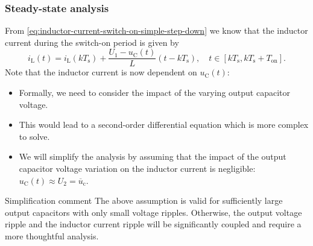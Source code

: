 \begin{frame}
    \frametitle{Steady-state analysis}
    From \eqref{eq:inductor-current-switch-on-simple-step-down} we know that the inductor current during the switch-on period is given by
    \begin{equation*}
        i_\mathrm{L}(t) = i_\mathrm{L}(k T_\mathrm{s}) + \frac{U_1-u_\mathrm{C}(t)}{L} (t - k T_\mathrm{s}), \quad t\in [k T_\mathrm{s}, k T_\mathrm{s} + T_\mathrm{on}]. 
    \end{equation*}
   Note that the inductor current is now dependent on $u_\mathrm{C}(t)$:
    \begin{itemize}
        \item Formally, we need to consider the impact of the varying output capacitor voltage.
        \item This would lead to a second-order differential equation which is more complex to solve.
        \item We will simplify the analysis by assuming that the impact of the output capacitor voltage variation on the inductor current is negligible: $u_\mathrm{C}(t) \approx U_2=\overline{u}_\mathrm{c}$.
    \end{itemize} 
    \vspace{-0.5cm}
    \begin{varblock}{Simplification comment}
        The above assumption is valid for sufficiently large output capacitors with only small voltage ripples. Otherwise, the output voltage ripple and the inductor current ripple will be significantly coupled and require a more thoughtful analysis.
    \end{varblock}
\end{frame}

